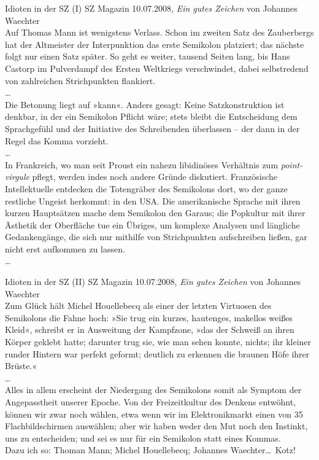 \begin{frame}
  {Idioten in der SZ (I)}
  \footnotesize
  SZ Magazin 10.07.2008, \textit{Ein gutes Zeichen} von Johannes Waechter\\
  \Zeile
  Auf Thomas Mann ist wenigstens Verlass. Schon im zweiten Satz des Zauberbergs hat der Altmeister der Interpunktion das erste Semikolon platziert; das nächste folgt nur einen Satz später. So geht es weiter, tausend Seiten lang, bis Hans Castorp im Pulverdampf des Ersten Weltkriegs verschwindet, dabei selbstredend von zahlreichen Strichpunkten flankiert.\\
  \ldots\\
  Die Betonung liegt auf »kann«. Anders gesagt: Keine Satzkonstruktion ist denkbar, in der ein Semikolon Pflicht wäre; stets bleibt die Entscheidung dem Sprachgefühl und der Initiative des Schreibenden überlassen – der dann in der Regel das Komma vorzieht.\\
  \ldots\\
  In Frankreich, wo man seit Proust ein nahezu libidinöses Verhältnis zum \textit{point-virgule} pflegt, werden indes noch andere Gründe diskutiert. Französische Intellektuelle entdecken die Totengräber des Semikolons dort, wo der ganze restliche Ungeist herkommt: in den USA. Die amerikanische Sprache mit ihren kurzen Hauptsätzen mache dem Semikolon den Garaus; die Popkultur mit ihrer Ästhetik der Oberfläche tue ein Übriges, um komplexe Analysen und längliche Gedankengänge, die sich nur mithilfe von Strichpunkten aufschreiben ließen, gar nicht erst aufkommen zu lassen.\\
  \ldots\\
\end{frame}

\begin{frame}
  {Idioten in der SZ (II)}
  \footnotesize
  SZ Magazin 10.07.2008, \textit{Ein gutes Zeichen} von Johannes Waechter\\
  \Zeile
  Zum Glück hält Michel Houellebecq als einer der letzten Virtuosen des Semikolons die Fahne hoch: »Sie trug ein kurzes, hautenges, makellos weißes Kleid«, schreibt er in Ausweitung der Kampfzone, »das der Schweiß an ihren Körper geklebt hatte; darunter trug sie, wie man sehen konnte, nichts; ihr kleiner runder Hintern war perfekt geformt; deutlich zu erkennen die braunen Höfe ihrer Brüste.«\\
  \ldots\\
  Alles in allem erscheint der Niedergang des Semikolons somit als Symptom der Angepasstheit unserer Epoche. Von der Freizeitkultur des Denkens entwöhnt, können wir zwar noch wählen, etwa wenn wir im Elektronikmarkt einen von 35 Flachbildschirmen auswählen; aber wir haben weder den Mut noch den Instinkt, uns zu entscheiden; und sei es nur für ein Semikolon statt eines Kommas.\\
  \Zeile
  \onslide<+->
  Dazu ich so: \alert{Thoman Mann; Michel Houellebecq; Johannes Waechter\ldots\ Kotz!}
\end{frame}


